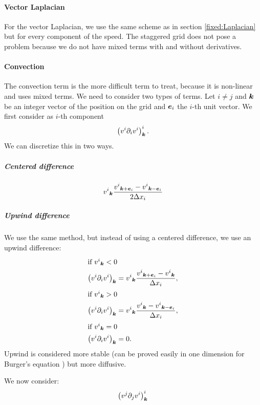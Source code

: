 \paragraph{Vector Laplacian}
\label{fixed:vect:laplacian}
For the vector Laplacian, we use the same scheme as in section \ref{fixed:Laplacian} but for every component of the speed.
The staggered grid does not pose a problem because we do not have mixed terms with and without derivatives.

\paragraph{Convection}

The convection term is the more difficult term to treat, because it is non-linear and uses mixed terms.
We need to consider two types of terms. Let $i\neq j$ and ${\boldsymbol {k}}$ be an integer vector of the position on the grid
and ${\boldsymbol {e}}_i$ the $i$-th unit vector.
We first consider as $i$-th component
\begin{equation}
\left(v^{i}\partial_{i}v^{i}\right)^{i}_{{\boldsymbol {k}}}.
\end{equation}
We can discretize this in two ways.

\subparagraph{Centered difference}
\begin{equation}
{v^{i}}_{{\boldsymbol {k}}}\frac{{v^{i}}_{{\boldsymbol {k}}+{\boldsymbol {e}}_i}-{v^{i}}_{{\boldsymbol {k}}-{\boldsymbol {e}}_i}}{2\Delta x_{i}}
\end{equation}

\subparagraph{Upwind difference}
\label{fixed:upwind}

We use the same method, but instead of using a centered difference, we use an upwind difference:
\begin{align}
\intertext{if ${v^{i}}_{{\boldsymbol {k}}}<0$}
\left(v^{i}\partial_{i}v^{i}\right)_{{\boldsymbol {k}}}&={v^{i}}_{{\boldsymbol {k}}}\frac{{v^{i}}_{{\boldsymbol {k}}+{\boldsymbol {e}}_i}-{v^{i}}_{{\boldsymbol {k}}}}{\Delta x_{i}},\\
\intertext{if ${v^{i}}_{{\boldsymbol {k}}}>0$}
\left(v^{i}\partial_{i}v^{i}\right)_{{\boldsymbol {k}}}&={v^{i}}_{{\boldsymbol {k}}}\frac{{v^{i}}_{{\boldsymbol {k}}}-{v^{i}}_{{\boldsymbol {k}}-{\boldsymbol {e}}_i}}{\Delta x_{i}},\\
\intertext{if ${v^{i}}_{{\boldsymbol {k}}}=0$}
\left(v^{i}\partial_{i}v^{i}\right)_{{\boldsymbol {k}}}&=0.
\end{align}
Upwind is considered more stable (can be proved easily in one dimension for Burger's equation \cite{citeulike:11163809}) but more diffusive.

We now consider:
\begin{equation}
\left(v^{j}\partial_{j}v^{i}\right)^{i}_{{\boldsymbol {k}}}
\end{equation}

